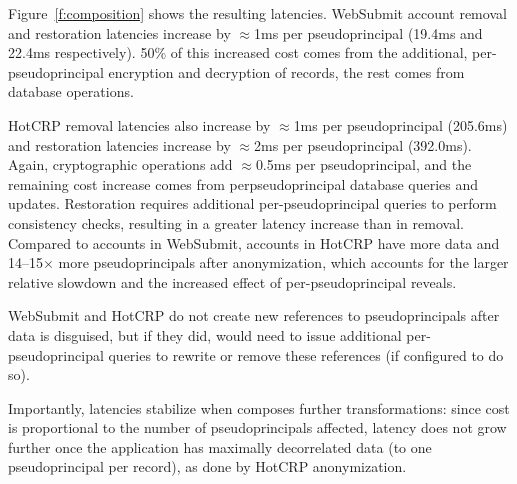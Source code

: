 %
Figure~\ref{f:composition} shows the resulting latencies.
%
WebSubmit account removal and restoration latencies increase by $\approx$1ms per
pseudoprincipal (19.4ms and 22.4ms respectively). 50\% of this increased cost
comes from the additional, per-pseudoprincipal encryption and decryption of
records, the rest comes from database operations.

%
HotCRP removal latencies also increase by $\approx$1ms per pseudoprincipal
(205.6ms) and restoration latencies increase by $\approx$2ms per pseudoprincipal
(392.0ms). Again, cryptographic operations add $\approx$0.5ms per
pseudoprincipal, and the remaining cost increase comes from
per\-pseudoprincipal
database queries and updates. Restoration requires additional per-pseudoprincipal
queries to \eg perform consistency checks, resulting in a greater latency
increase than in removal. 
%
Compared to accounts in WebSubmit, accounts in HotCRP have more data and
14--15$\times$ more pseudoprincipals after anonymization, which accounts for the
larger relative slowdown and the increased effect of per-pseudoprincipal
reveals.

WebSubmit and HotCRP do not create new references to pseudoprincipals after data
is disguised, but if they did, \sys would need to issue additional
per-pseudoprincipal queries to rewrite or remove these references (if configured
to do so).
%
%
%
%
%

%
Importantly, \xxing latencies stabilize when \sys composes further \xxing
transformations: since cost is proportional to the number of pseudoprincipals
affected, latency does not grow further once the application has maximally decorrelated
data (to one pseudoprincipal per record), as done by HotCRP anonymization.
%



